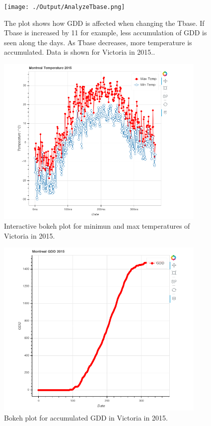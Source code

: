 \documentclass[12pt]{article}
\begin{document}
	\begin{figure}[!htbp]
		\centering
		\texttt{[image: ./Output/AnalyzeTbase.png]} 
		\caption{\scriptsize The plot shows how GDD is affected when changing the Tbase. If
		Tbase is increased by 11 for example, less accumulation of GDD is seen along the days. As Tbase 
		decreases, more temperature is accumulated. Data is shown for Victoria in 2015..}\label{analyzeTbase}		  
	\end{figure}

	\begin{figure}[!htbp]
		\centering
		\includegraphics[width=0.9\textwidth]{./Report/tempMontreal.png} 
		\caption{\scriptsize Interactive bokeh plot for minimun and max temperatures of
		Victoria in 2015.}\label{bokehTempMontreal}		  
	\end{figure}
	
	\begin{figure}[!htbp]
		\centering
		\includegraphics[width=0.9\textwidth]{./Report/accGDD.png} 
		\caption{\scriptsize Bokeh plot for accumulated GDD in Victoria in 2015.}\label{bokehAccGDD}		  
	\end{figure}
	
\end{document}
